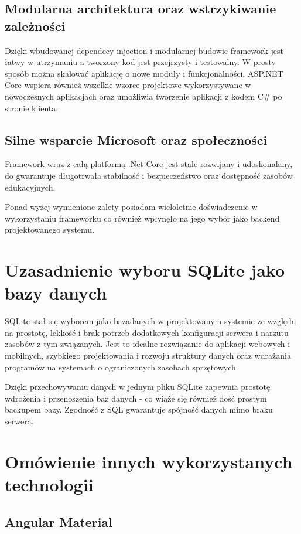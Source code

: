 \subsection{Modularna architektura oraz wstrzykiwanie zależności}
Dzięki wbudowanej dependecy injection i modularnej budowie framework jest łatwy w utrzymaniu a tworzony kod jest przejrzysty i testowalny. W prosty sposób można skalować aplikację o nowe moduły i funkcjonalności.
ASP.NET Core wspiera również wszelkie wzorce projektowe wykorzystywane w nowoczesnych aplikacjach oraz umożliwia tworzenie aplikacji z kodem C\# po stronie klienta.

\subsection{Silne wsparcie Microsoft oraz społeczności}
Framework wraz z całą platformą .Net Core jest stale rozwijany i udoskonalany, do gwarantuje długotrwała stabilność i bezpieczeństwo oraz dostępność zasobów edukacyjnych.

Ponad wyżej wymienione zalety posiadam wieloletnie doświadczenie w wykorzystaniu frameworku co również wpłynęło na jego wybór jako backend projektowanego systemu.

\section{Uzasadnienie wyboru SQLite jako bazy danych}

SQLite stał się wyborem jako bazadanych w projektowanym systemie ze względu na prostotę, lekkość i brak potrzeb dodatkowych konfiguracji serwera i narzutu zasobów z tym związanych. Jest to idealne rozwiązanie do aplikacji webowych i mobilnych, szybkiego projektowania i rozwoju struktury danych oraz wdrażania programów na systemach o ograniczonych zasobach sprzętowych.

Dzięki przechowywaniu danych w jednym pliku SQLite zapewnia prostotę wdrożenia i przenoszenia baz danych - co wiąże się również dość prostym backupem bazy. Zgodność z SQL gwarantuje spójność danych mimo braku serwera.

\section{Omówienie innych wykorzystanych technologii}

\subsection{Angular Material}

